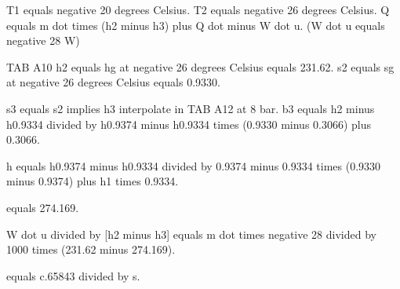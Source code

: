 T1 equals negative 20 degrees Celsius.
T2 equals negative 26 degrees Celsius.
Q equals m dot times (h2 minus h3) plus Q dot minus W dot u.
(W dot u equals negative 28 W)

TAB A10
h2 equals hg at negative 26 degrees Celsius equals 231.62.
s2 equals sg at negative 26 degrees Celsius equals 0.9330.

s3 equals s2 implies h3 interpolate in TAB A12 at 8 bar.
b3 equals h2 minus h0.9334 divided by h0.9374 minus h0.9334 times (0.9330 minus 0.3066) plus 0.3066.

h equals h0.9374 minus h0.9334 divided by 0.9374 minus 0.9334 times (0.9330 minus 0.9374) plus h1 times 0.9334.

equals 274.169.

W dot u divided by [h2 minus h3] equals m dot times negative 28 divided by 1000 times (231.62 minus 274.169).

equals c.65843 divided by s.